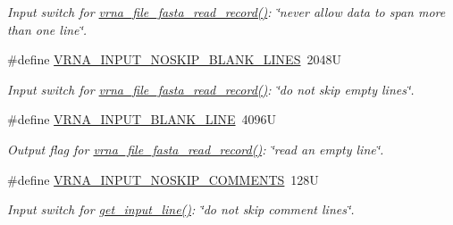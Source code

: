 \begin{DoxyCompactItemize}
\begin{DoxyCompactList}\small\item\em Input switch for \hyperlink{group__file__utils_ga8cfb7e271efc9e1f34640acb85475639}{vrna\+\_\+file\+\_\+fasta\+\_\+read\+\_\+record()}\+: {\itshape \char`\"{}never allow data to span more than one line\char`\"{}}. \end{DoxyCompactList}\item 
\mbox{\label{group__utils_gab4db885222b3b69608310d7c7e63e286}} 
\#define \hyperlink{group__utils_gab4db885222b3b69608310d7c7e63e286}{V\+R\+N\+A\+\_\+\+I\+N\+P\+U\+T\+\_\+\+N\+O\+S\+K\+I\+P\+\_\+\+B\+L\+A\+N\+K\+\_\+\+L\+I\+N\+ES}~2048U
\begin{DoxyCompactList}\small\item\em Input switch for \hyperlink{group__file__utils_ga8cfb7e271efc9e1f34640acb85475639}{vrna\+\_\+file\+\_\+fasta\+\_\+read\+\_\+record()}\+: {\itshape \char`\"{}do not skip empty lines\char`\"{}}. \end{DoxyCompactList}\item 
\mbox{\label{group__utils_ga305474b93ccb79ae4c7754016a8ddd84}} 
\#define \hyperlink{group__utils_ga305474b93ccb79ae4c7754016a8ddd84}{V\+R\+N\+A\+\_\+\+I\+N\+P\+U\+T\+\_\+\+B\+L\+A\+N\+K\+\_\+\+L\+I\+NE}~4096U
\begin{DoxyCompactList}\small\item\em Output flag for \hyperlink{group__file__utils_ga8cfb7e271efc9e1f34640acb85475639}{vrna\+\_\+file\+\_\+fasta\+\_\+read\+\_\+record()}\+: {\itshape \char`\"{}read an empty line\char`\"{}}. \end{DoxyCompactList}\item 
\mbox{\label{group__utils_ga0f6311f11bed1842e3a527ab27b294c6}} 
\#define \hyperlink{group__utils_ga0f6311f11bed1842e3a527ab27b294c6}{V\+R\+N\+A\+\_\+\+I\+N\+P\+U\+T\+\_\+\+N\+O\+S\+K\+I\+P\+\_\+\+C\+O\+M\+M\+E\+N\+TS}~128U
\begin{DoxyCompactList}\small\item\em Input switch for \hyperlink{group__utils_ga8ef1835eb83f542396f59f0b205965e5}{get\+\_\+input\+\_\+line()}\+: {\itshape \char`\"{}do not skip comment lines\char`\"{}}. \end{DoxyCompactList}\item 
\mbox{\label{group__utils_gaf2062e0eeefffd3ed639af460b3d4fab}} 

\end{DoxyCompactItemize}
